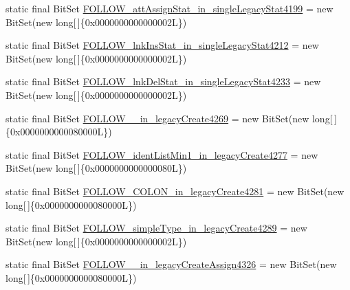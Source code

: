 \begin{DoxyCompactItemize}
\item 
static final Bit\-Set \hyperlink{classorg_1_1tzi_1_1use_1_1parser_1_1testsuite_1_1_test_suite_parser_ac17a03f322d63d84b5205c3522362ebd}{F\-O\-L\-L\-O\-W\-\_\-att\-Assign\-Stat\-\_\-in\-\_\-single\-Legacy\-Stat4199} = new Bit\-Set(new long\mbox{[}$\,$\mbox{]}\{0x0000000000000002\-L\})
\item 
static final Bit\-Set \hyperlink{classorg_1_1tzi_1_1use_1_1parser_1_1testsuite_1_1_test_suite_parser_a68014e7c85bb823e7b020418a8281d4d}{F\-O\-L\-L\-O\-W\-\_\-lnk\-Ins\-Stat\-\_\-in\-\_\-single\-Legacy\-Stat4212} = new Bit\-Set(new long\mbox{[}$\,$\mbox{]}\{0x0000000000000002\-L\})
\item 
static final Bit\-Set \hyperlink{classorg_1_1tzi_1_1use_1_1parser_1_1testsuite_1_1_test_suite_parser_a20510e5580daee2830920d2e88bdc8f7}{F\-O\-L\-L\-O\-W\-\_\-lnk\-Del\-Stat\-\_\-in\-\_\-single\-Legacy\-Stat4233} = new Bit\-Set(new long\mbox{[}$\,$\mbox{]}\{0x0000000000000002\-L\})
\item 
static final Bit\-Set \hyperlink{classorg_1_1tzi_1_1use_1_1parser_1_1testsuite_1_1_test_suite_parser_a1645707193b0cc0d845f0562adb1e0af}{F\-O\-L\-L\-O\-W\-\_\-\_\-in\-\_\-legacy\-Create4269} = new Bit\-Set(new long\mbox{[}$\,$\mbox{]}\{0x0000000000080000\-L\})
\item 
static final Bit\-Set \hyperlink{classorg_1_1tzi_1_1use_1_1parser_1_1testsuite_1_1_test_suite_parser_aaaff33916d5c33b008d7c789a2167016}{F\-O\-L\-L\-O\-W\-\_\-ident\-List\-Min1\-\_\-in\-\_\-legacy\-Create4277} = new Bit\-Set(new long\mbox{[}$\,$\mbox{]}\{0x0000000000000080\-L\})
\item 
static final Bit\-Set \hyperlink{classorg_1_1tzi_1_1use_1_1parser_1_1testsuite_1_1_test_suite_parser_aafbd850b6be4fe317da6afbb3803662f}{F\-O\-L\-L\-O\-W\-\_\-\-C\-O\-L\-O\-N\-\_\-in\-\_\-legacy\-Create4281} = new Bit\-Set(new long\mbox{[}$\,$\mbox{]}\{0x0000000000080000\-L\})
\item 
static final Bit\-Set \hyperlink{classorg_1_1tzi_1_1use_1_1parser_1_1testsuite_1_1_test_suite_parser_a61c39e3b43cb7473d733d2e3ee3a6db3}{F\-O\-L\-L\-O\-W\-\_\-simple\-Type\-\_\-in\-\_\-legacy\-Create4289} = new Bit\-Set(new long\mbox{[}$\,$\mbox{]}\{0x0000000000000002\-L\})
\item 
static final Bit\-Set \hyperlink{classorg_1_1tzi_1_1use_1_1parser_1_1testsuite_1_1_test_suite_parser_a56cc9d8dbe875f6e943ca764b4e7d8ad}{F\-O\-L\-L\-O\-W\-\_\-\_\-in\-\_\-legacy\-Create\-Assign4326} = new Bit\-Set(new long\mbox{[}$\,$\mbox{]}\{0x0000000000080000\-L\})
\item 

\end{DoxyCompactItemize}
